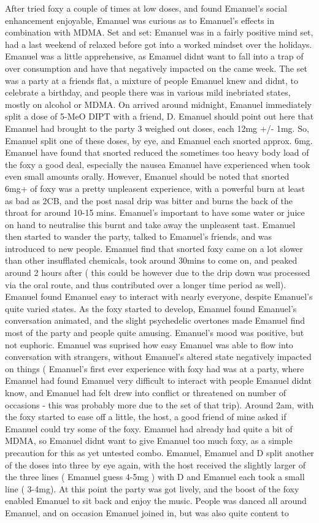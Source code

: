 \documentclass[12pt]{book}
\begin{document}
After tried foxy a couple of times at low doses, and found Emanuel's social enhancement enjoyable, Emanuel was curious as to Emanuel's effects in combination with MDMA. Set and set: Emanuel was in a fairly positive mind set, had a last weekend of relaxed before got into a worked mindset over the holidays. Emanuel was a little apprehensive, as Emanuel didnt want to fall into a trap of over consumption and have that negatively impacted on the came week. The set was a party at a friends flat, a mixture of people Emanuel knew and didnt, to celebrate a birthday, and people there was in various mild inebriated states, mostly on alcohol or MDMA. On arrived around midnight, Emanuel immediately split a dose of 5-MeO DIPT with a friend, D. Emanuel should point out here that Emanuel had brought to the party 3 weighed out doses, each 12mg +/- 1mg. So, Emanuel split one of these doses, by eye, and Emanuel each snorted approx. 6mg. Emanuel have found that snorted reduced the sometimes too heavy body load of the foxy a good deal, especially the nausea Emanuel have experienced when took even small amounts orally. However, Emanuel should be noted that snorted 6mg+ of foxy was a pretty unpleasent experience, with a powerful burn at least as bad as 2CB, and the post nasal drip was bitter and burns the back of the throat for around 10-15 mins. Emanuel's important to have some water or juice on hand to neutralise this burnt and take away the unpleasent tast. Emanuel then started to wander the party, talked to Emanuel's friends, and was introduced to new people. Emanuel find that snorted foxy came on a lot slower than other insufflated chemicals, took around 30mins to come on, and peaked around 2 hours after ( this could be however due to the drip down was processed via the oral route, and thus contributed over a longer time period as well). Emanuel found Emanuel easy to interact with nearly everyone, despite Emanuel's quite varied states. As the foxy started to develop, Emanuel found Emanuel's conversation animated, and the slight psychedelic overtones made Emanuel find most of the party and people quite amusing. Emanuel's mood was positive, but not euphoric. Emanuel was suprised how easy Emanuel was able to flow into conversation with strangers, without Emanuel's altered state negatively impacted on things ( Emanuel's first ever experience with foxy had was at a party, where Emanuel had found Emanuel very difficult to interact with people Emanuel didnt know, and Emanuel had felt drew into conflict or threatened on number of occasions - this was probably more due to the set of that trip). Around 2am, with the foxy started to ease off a little, the host, a good friend of mine asked if Emanuel could try some of the foxy. Emanuel had already had quite a bit of MDMA, so Emanuel didnt want to give Emanuel too much foxy, as a simple precaution for this as yet untested combo. Emanuel, Emanuel and D split another of the doses into three by eye again, with the host received the slightly larger of the three lines ( Emanuel guess 4-5mg ) with D and Emanuel each took a small line ( 3-4mg). At this point the party was got lively, and the boost of the foxy enabled Emanuel to sit back and enjoy the music. People was danced all around Emanuel, and on occasion Emanuel joined in, but was also quite content to 
\end{document}
